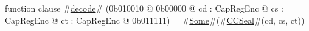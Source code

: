 function clause #\hyperref[zdecode]{decode}# (0b010010 @ 0b00000 @ cd : CapRegEnc @ cs : CapRegEnc @ ct : CapRegEnc @ 0b011111) = #\hyperref[zSome]{Some}#(#\hyperref[zCCSeal]{CCSeal}#(cd, cs, ct))
